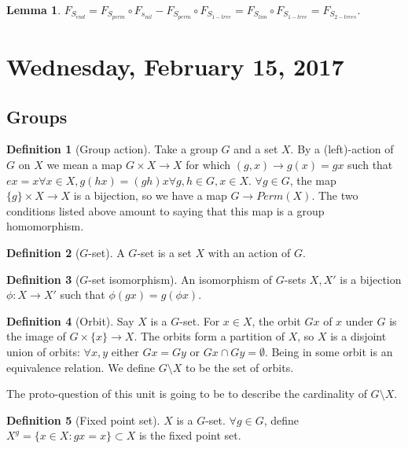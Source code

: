 \documentclass[12pt]{article}
\theoremstyle{definition}
\newtheorem{defn}{Definition}
\newtheorem{lemma}[theorem]{Lemma}
\begin{document}
\begin{lemma}
    $F_{S_{end}} = F_{S_{perm}} \circ F_{s_{nil}} - F_{S_{perm}} \circ
    F_{S_{1-tree}} = F_{S_{lim}} \circ F_{S_{1-tree}} = F_{S_{2-trees}}$.
\end{lemma}

\section{Wednesday, February 15, 2017}

\subsection{Groups}

\begin{defn}[Group action]
    Take a group $G$ and a set $X$. By a (left)-action of $G$ on $X$ we mean a
    map $G \times X \rightarrow X$ for which $(g, x) \rightarrow g(x) = gx$
    such that $ex =x \forall x \in X, g(hx) = (gh)x \forall g, h \in G, x \in
    X$. $\forall g \in G$, the map $\{g\} \times X \rightarrow X$ is a
    bijection, so we have a map $G \rightarrow Perm(X)$. The two conditions
    listed above amount to saying that this map is a group homomorphism.
\end{defn}

\begin{defn}[$G$-set]
    A $G$-set is a set $X$ with an action of $G$.
\end{defn}

\begin{defn}[$G$-set isomorphism]
    An isomorphism of $G$-sets $X, X'$ is a bijection $\phi: X \rightarrow X'$
    such that $\phi(gx) = g(\phi x)$.
\end{defn}

\begin{defn}[Orbit]
    Say $X$ is a $G$-set. For $x \in X$, the orbit $Gx$ of $x$ under $G$ is the
    image of $G \times \{x\} \rightarrow X$. The orbits form a partition of
    $X$, so $X$ is a disjoint union of orbits: $\forall x, y$ either $Gx = Gy$
    or $Gx \cap Gy = \emptyset$. Being in some orbit is an equivalence
    relation. We define $G \setminus X$ to be the set of orbits.

    The proto-question of this unit is going to be to describe the cardinality
    of $G \setminus X$.
\end{defn}

\begin{defn}[Fixed point set]
    $X$ is a $G$-set. $\forall g \in G$, define $X^g = \{x \in X : gx = x\}
    \subset X$ is the fixed point set.
\end{defn}
\end{document}
